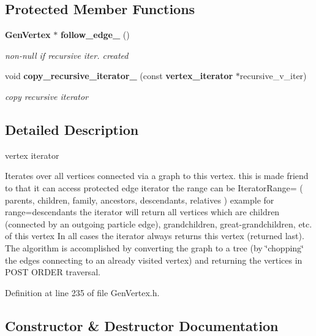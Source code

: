 \subsection*{Protected Member Functions}
\begin{CompactItemize}
\item 
{\bf Gen\-Vertex} $\ast$ {\bf follow\_\-edge\_\-} ()
\begin{CompactList}\small\item\em non-null if recursive iter. created \item\end{CompactList}\item 
void {\bf copy\_\-recursive\_\-iterator\_\-} (const {\bf vertex\_\-iterator} $\ast$recursive\_\-v\_\-iter)
\begin{CompactList}\small\item\em copy recursive iterator \item\end{CompactList}\end{CompactItemize}


\subsection{Detailed Description}
vertex iterator 

Iterates over all vertices connected via a graph to this vertex. this is made friend to that it can access protected edge iterator the range can be Iterator\-Range= ( parents, children, family, ancestors, descendants, relatives ) example for range=descendants the iterator will return all vertices which are children (connected by an outgoing particle edge), grandchildren, great-grandchildren, etc. of this vertex In all cases the iterator always returns this vertex (returned last). The algorithm is accomplished by converting the graph to a tree (by \char`\"{}chopping\char`\"{} the edges connecting to an already visited vertex) and returning the vertices in POST ORDER traversal. 



Definition at line 235 of file Gen\-Vertex.h.

\subsection{Constructor \& Destructor Documentation}
